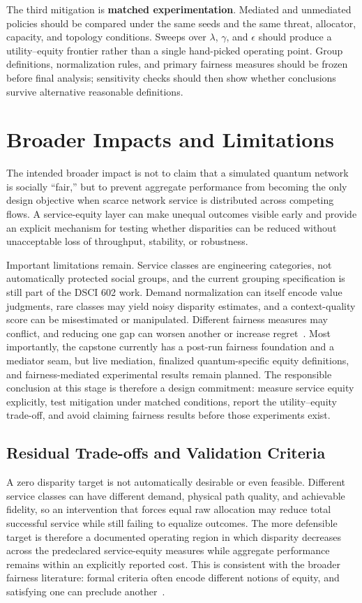 \documentclass[conference]{IEEEtran}
\begin{document}
The third mitigation is \textbf{matched experimentation}. Mediated and unmediated policies should be compared under the same seeds and the same threat, allocator, capacity, and topology conditions. Sweeps over $\lambda$, $\gamma$, and $\epsilon$ should produce a utility--equity frontier rather than a single hand-picked operating point. Group definitions, normalization rules, and primary fairness measures should be frozen before final analysis; sensitivity checks should then show whether conclusions survive alternative reasonable definitions.

\section{Broader Impacts and Limitations}

The intended broader impact is not to claim that a simulated quantum network is socially ``fair,'' but to prevent aggregate performance from becoming the only design objective when scarce network service is distributed across competing flows. A service-equity layer can make unequal outcomes visible early and provide an explicit mechanism for testing whether disparities can be reduced without unacceptable loss of throughput, stability, or robustness.

Important limitations remain. Service classes are engineering categories, not automatically protected social groups, and the current grouping specification is still part of the DSCI 602 work. Demand normalization can itself encode value judgments, rare classes may yield noisy disparity estimates, and a context-quality score can be misestimated or manipulated. Different fairness measures may conflict, and reducing one gap can worsen another or increase regret~\cite{joseph2016fairness,chouldechova2017fair,kleinberg2017tradeoffs}. Most importantly, the capstone currently has a post-run fairness foundation and a mediator seam, but live mediation, finalized quantum-specific equity definitions, and fairness-mediated experimental results remain planned. The responsible conclusion at this stage is therefore a design commitment: measure service equity explicitly, test mitigation under matched conditions, report the utility--equity trade-off, and avoid claiming fairness results before those experiments exist.

\subsection{Residual Trade-offs and Validation Criteria}
A zero disparity target is not automatically desirable or even feasible. Different service classes can have different demand, physical path quality, and achievable fidelity, so an intervention that forces equal raw allocation may reduce total successful service while still failing to equalize outcomes. The more defensible target is therefore a documented operating region in which disparity decreases across the predeclared service-equity measures while aggregate performance remains within an explicitly reported cost. This is consistent with the broader fairness literature: formal criteria often encode different notions of equity, and satisfying one can preclude another~\cite{hardt2016equality,chouldechova2017fair,kleinberg2017tradeoffs}.
\end{document}
